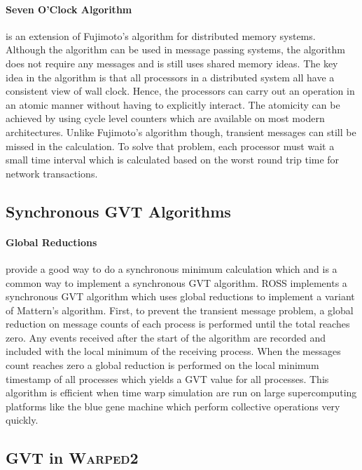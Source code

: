 \documentclass[11pt]{book}
\begin{document}
\paragraph{Seven O'Clock Algorithm}\cite{bauer-05} is an extension of Fujimoto's algorithm
for distributed memory systems. Although the algorithm can be used in message passing systems,
the algorithm does not require any messages and is still uses shared memory ideas. The key idea
in the algorithm is that all processors in a distributed system all have a consistent view
of wall clock. Hence, the processors can carry out an operation in an atomic manner without having
to explicitly interact. The atomicity can be achieved by using cycle level counters which
are available on most modern architectures. Unlike Fujimoto's algorithm though, transient
messages can still be missed in the calculation. To solve that problem, each processor must
wait a small time interval which is calculated based on the worst round trip time for
network transactions.

\subsection{Synchronous GVT Algorithms}

\paragraph{Global Reductions} provide a good way to do a synchronous minimum calculation
which and is a common way to implement a synchronous GVT algorithm. ROSS implements a
synchronous GVT algorithm which uses global reductions to implement a variant of Mattern's
algorithm\cite{holder-08}. First, to prevent the transient message problem, a global reduction
on message counts of each process is performed until the total reaches zero. Any events received
after the start of the algorithm are recorded and included with the local minimum of the receiving
process. When the messages count reaches zero a global reduction is performed on the local minimum
timestamp of all processes which yields a GVT value for all processes. This algorithm is efficient
when time warp simulation are run on large supercomputing platforms like the blue gene machine
which perform collective operations very quickly.

\subsection{GVT in \textsc{Warped2}}
\end{document}
